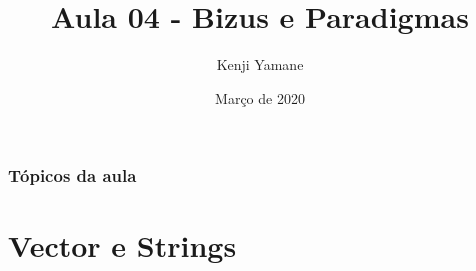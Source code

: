 \documentclass{beamer}
\title[Apresentação]{Aula 04 - Bizus e Paradigmas}
\author[\textit{Kenji Yamane}]{Kenji Yamane}
\date{Março de 2020}
\begin{document}
\begin{frame}

\titlepage


\end{frame}

\begin{frame}

\frametitle{Tópicos da aula}

\tableofcontents

\end{frame}

\section{Vector e Strings}
	
\end{document}
